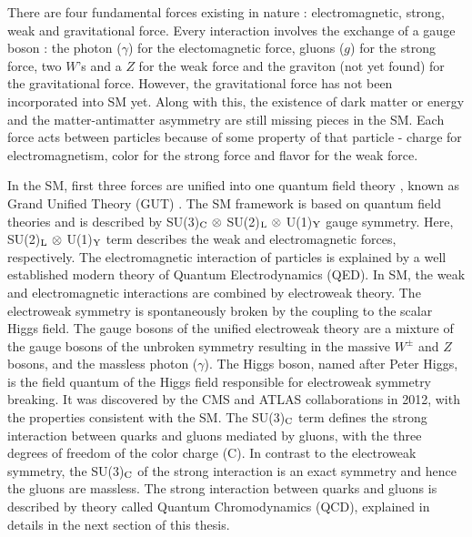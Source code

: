 There are four fundamental forces existing in nature : electromagnetic, strong, weak and gravitational force. Every interaction involves the exchange of a gauge boson : the photon ($\gamma$) for the electomagnetic force, gluons ($g$) for the strong force, two $W$'s and a $Z$ for the weak force and the graviton (not yet found) for the gravitational force. However, the gravitational force has not been incorporated into SM yet. Along with this, the existence of dark matter or energy and the matter-antimatter asymmetry are still missing pieces in the SM. Each force acts between particles because of some property of that particle - charge for electromagnetism, color for the strong force and flavor for the weak force. 

In the SM, first three forces are unified into one quantum field theory \cite{Peskin:1995ev}, known as Grand Unified Theory (GUT) \cite{Glashow:1979pj,Salam:1980jd,Georgi:1974sy}. The SM framework is based on quantum field theories and is described by SU(3)$_{\rm C}~\otimes$ SU(2)$_{\rm L}~\otimes$ U(1)$_{\rm Y}$ gauge symmetry. Here, SU(2)$_{\rm L}~\otimes$ U(1)$_{\rm Y}$ term describes the weak and electromagnetic forces, respectively. The electromagnetic interaction of particles is explained by a well established modern theory of Quantum Electrodynamics (QED). In SM, the weak and electromagnetic interactions are combined by electroweak theory. The electroweak symmetry is spontaneously broken by the coupling to the scalar Higgs field. The gauge bosons of the unified electroweak theory are a mixture of the gauge bosons of the unbroken symmetry resulting in the massive $W^{\pm}$ and $Z$ bosons, and the massless photon ($\gamma$). The Higgs boson, named after Peter Higgs, is the field quantum of the Higgs field responsible for electroweak symmetry breaking. It was discovered by the CMS \cite{Chatrchyan:2012xdj} and ATLAS \cite{Aad:2012tfa}  collaborations in 2012, with the properties consistent with the SM. The SU(3)$_{\rm C}$ term defines the strong interaction between quarks and gluons mediated by gluons, with the three degrees of freedom of the color charge (C). In contrast to the electroweak symmetry, the SU(3)$_{\rm C}$ of the strong interaction is an exact symmetry and hence the gluons are massless. The strong interaction between quarks and gluons is described by theory called Quantum Chromodynamics (QCD), explained in details in the next section of this thesis.

